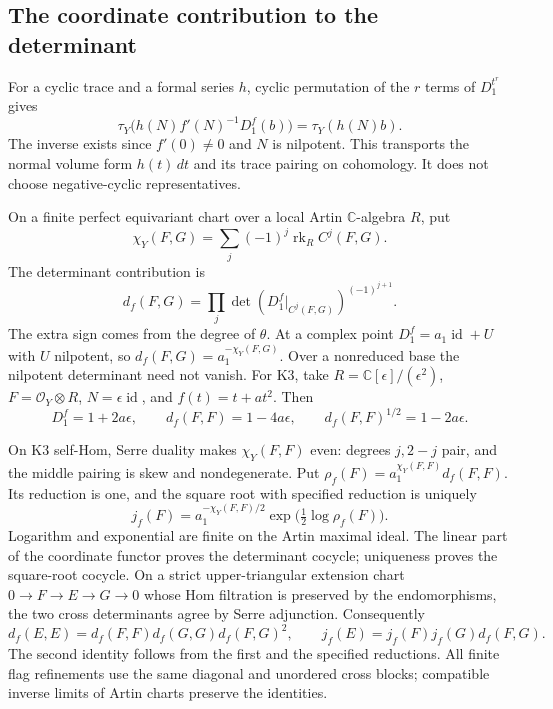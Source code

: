 \subsection{The coordinate contribution to the determinant}

For a cyclic trace and a formal series $h$, cyclic
permutation of the $r$ terms of $D_1^{t^r}$ gives
\begin{equation}\label{cyprim:eq:coordinate-trace}
 \tau_Y\bigl(h(N)f'(N)^{-1}D_1^f(b)\bigr)
       =\tau_Y(h(N)b).
\end{equation}
The inverse exists since $f'(0)\ne0$ and $N$ is
nilpotent. This transports the normal volume form
$h(t)\,dt$ and its trace pairing on cohomology.
It does not choose negative-cyclic representatives.

On a finite perfect equivariant chart over a local
Artin $\mathbb C$-algebra $R$, put
\[
 \chi_Y(F,G)=\sum_j(-1)^j\operatorname{rk}_R C^j(F,G).
\]
The determinant contribution is
\begin{equation}\label{cyprim:eq:coordinate-det}
 d_f(F,G)=\prod_j
 \det(D_1^f|_{C^j(F,G)})^{(-1)^{j+1}}.
\end{equation}
The extra sign comes from the degree of $\theta$.
At a complex point $D_1^f=a_1\operatorname{id}+U$
with $U$ nilpotent, so $d_f(F,G)=a_1^{-\chi_Y(F,G)}$.
Over a nonreduced base the nilpotent determinant
need not vanish. For K3, take
$R=\mathbb C[\epsilon]/(\epsilon^2)$,
$F=\mathcal O_Y\otimes R$, $N=\epsilon\operatorname{id}$,
and $f(t)=t+at^2$. Then
\[
 D_1^f=1+2a\epsilon,\qquad
 d_f(F,F)=1-4a\epsilon,\qquad d_f(F,F)^{1/2}=1-2a\epsilon.
\]

On K3 self-Hom, Serre duality makes $\chi_Y(F,F)$
even: degrees $j,2-j$ pair, and the middle pairing
is skew and nondegenerate. Put
$\rho_f(F)=a_1^{\chi_Y(F,F)}d_f(F,F)$.
Its reduction is one, and the square root with
specified reduction is uniquely
\begin{equation}\label{cyprim:eq:coordinate-half}
 j_f(F)=a_1^{-\chi_Y(F,F)/2}
        \exp\bigl(\tfrac12\log\rho_f(F)\bigr).
\end{equation}
Logarithm and exponential are finite on the Artin
maximal ideal. The linear part of the coordinate
functor proves the determinant cocycle; uniqueness
proves the square-root cocycle.
On a strict upper-triangular extension chart
$0\to F\to E\to G\to0$ whose Hom filtration is
preserved by the endomorphisms, the two cross
determinants agree by Serre adjunction. Consequently
\[
 d_f(E,E)=d_f(F,F)d_f(G,G)d_f(F,G)^2,\qquad
 j_f(E)=j_f(F)j_f(G)d_f(F,G).
\]
The second identity follows from the first and the
specified reductions. All finite flag refinements
use the same diagonal and unordered cross blocks;
compatible inverse limits of Artin charts preserve
the identities.

